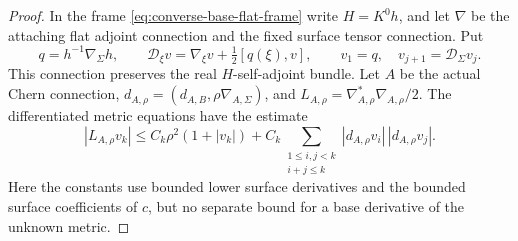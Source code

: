 \documentclass[11pt]{amsart}
\theoremstyle{definition}
\theoremstyle{remark}
\theoremstyle{plain}
\begin{document}
\begin{proof}
In the frame \eqref{eq:converse-base-flat-frame} write $H=K^0h$,
and let $\nabla$ be the attaching flat adjoint connection and the
fixed surface tensor connection. Put
\[
 q=h^{-1}\nabla_\Sigma h,\qquad
 \mathcal D_\xi v=\nabla_\xi v+\tfrac12[q(\xi),v],\qquad
 v_1=q,\quad v_{j+1}=\mathcal D_\Sigma v_j.
\]
This connection preserves the real $H$-self-adjoint bundle.
Let $A$ be the actual Chern connection,
$d_{A,\rho}=(d_{A,B},\rho\nabla_{A,\Sigma})$, and
$L_{A,\rho}=\nabla_{A,\rho}^*\nabla_{A,\rho}/2$.
The differentiated metric equations have the estimate
\begin{equation}\label{eq:converse-metric-variation}
 |L_{A,\rho}v_k|\leq C_k\rho^2(1+|v_k|)
  +C_k\sum_{\substack{1\leq i,j<k\\i+j\leq k}}
                         |d_{A,\rho}v_i|\,|d_{A,\rho}v_j|.
\end{equation}
Here the constants use bounded lower surface derivatives and
the bounded surface coefficients of $c$, but no separate bound
for a base derivative of the unknown metric.


\end{proof}
\end{document}
